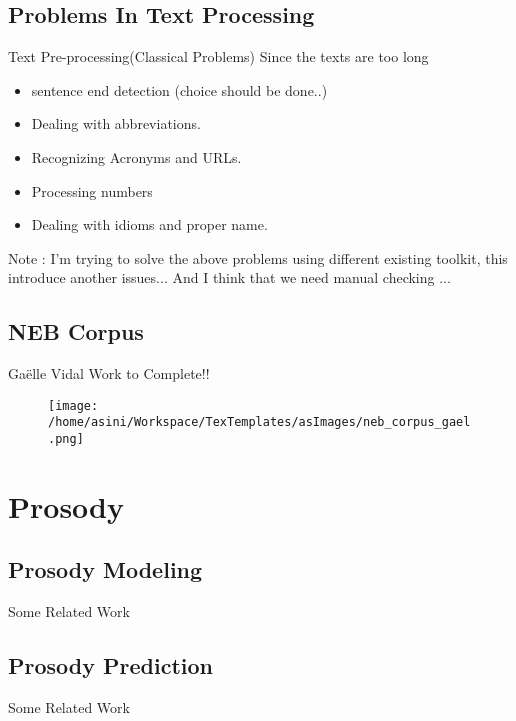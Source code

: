 \documentclass{beamer}
\begin{document}
\subsection{Problems In Text Processing }
\begin{frame}{Text Pre-processing(Classical Problems)}
	Since the texts are  too long
		\begin{itemize}
			\item sentence end detection (choice should be done..)
			\item Dealing with abbreviations.
			\item Recognizing Acronyms and URLs.
			\item Processing numbers
			\item Dealing with idioms and proper name.
		\end{itemize}
	 Note : I'm trying to solve the above problems using different existing toolkit, this introduce another issues... And I think that we need manual checking ... 
	 \end{frame}
%
\subsection{NEB Corpus }
\begin{frame}{Gaëlle Vidal Work to Complete!!}
\begin{figure}
	\texttt{[image: /home/asini/Workspace/TexTemplates/asImages/neb\_corpus\_gael.png]}

\end{figure}

\end{frame}
%
\section{Prosody}
\subsection{Prosody Modeling}
\begin{frame}{Some Related Work}
	
\end{frame}

\subsection{Prosody Prediction}
\begin{frame}{Some Related Work}
	
\end{frame}
%
\end{document}
